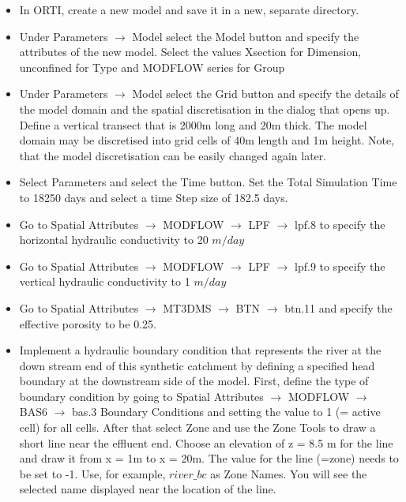 \begin{itemize}

\item In ORTI, create a new model and save it in a new, separate directory.

\item Under {\color{blue}Parameters} $\rightarrow$ {\color{blue}Model} select the {\color{blue}Model} button and specify the attributes of the new model. Select the values {\color{blue}Xsection} for {\color{blue}Dimension}, {\color{blue}unconfined} for {\color{blue}Type} 
and {\color{blue}MODFLOW series} for {\color{blue}Group} 

\item Under {\color{blue}Parameters} $\rightarrow$ {\color{blue}Model} select the {\color{blue}Grid} button and specify the details of the model domain and the spatial discretisation in the dialog that opens up. Define a vertical transect that is 2000m long and 20m thick. The model domain
may be discretised into grid cells of 40m length and 1m height. Note, that the 
model discretisation can be easily changed again later. 

\item Select {\color{blue}Parameters} and select the {\color{blue}Time} button.
Set the {\color{blue}Total Simulation Time} to 18250 days and select a time {\color{blue}Step size}
of 182.5 days. 

\item Go to {\color{blue}Spatial Attributes} $\rightarrow$ {\color{blue}MODFLOW} $\rightarrow$ {\color{blue}LPF} $\rightarrow$ {\color{blue}lpf.8} to specify the horizontal hydraulic conductivity to 20 $m/day$

\item Go to {\color{blue}Spatial Attributes} $\rightarrow$ {\color{blue}MODFLOW} $\rightarrow$ {\color{blue}LPF} $\rightarrow$ {\color{blue}lpf.9} to specify the vertical hydraulic conductivity to 1 $m/day$

\item Go to {\color{blue}Spatial Attributes} $\rightarrow$ {\color{blue}MT3DMS} $\rightarrow$ {\color{blue}BTN} $\rightarrow$ {\color{blue}btn.11} and specify the effective porosity to be 0.25.


\item Implement a hydraulic boundary condition that represents the river at the down stream end of this synthetic catchment by defining a specified head boundary at the downstream side of the model. First, define the type of boundary condition by going to {\color{blue}Spatial Attributes} $\rightarrow$ {\color{blue}MODFLOW} $\rightarrow$ {\color{blue}BAS6} $\rightarrow$ {\color{blue}bas.3 Boundary Conditions} and setting the value to 1 (= active cell) for all cells. After that select {\color{blue}Zone} and use the {\color{blue}Zone Tools} to draw a short line near the effluent end. Choose an elevation of z = 8.5 m for the line and draw it from x = 1m to x = 20m. 
The value for the line (=zone) needs to be set to -1. Use, for example,
$river\_bc$ as {\color{blue}Zone Names}. You will see the selected name displayed near 
the location of the line.
  

\end{itemize}
